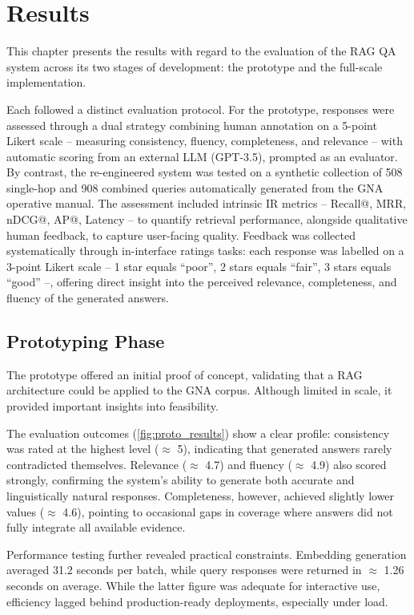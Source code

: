 \chapter{Results}
\label{chap:results}
\begin{spacing}{1.5}

This chapter presents the results with regard to the evaluation of the RAG QA system across its two stages of development: the prototype and the full-scale implementation. 

Each followed a distinct evaluation protocol. For the prototype, responses were assessed through a dual strategy combining human annotation on a 5-point Likert scale -- measuring consistency, fluency, completeness, and relevance -- with automatic scoring from an external LLM (GPT-3.5), prompted as an evaluator. By contrast, the re-engineered system was tested on a synthetic collection of 508 single-hop and 908 combined queries automatically generated from the GNA operative manual. The assessment included intrinsic IR metrics -- Recall@, MRR, nDCG@, AP@, Latency --  to quantify retrieval performance, alongside qualitative human feedback, to capture user-facing quality. Feedback was collected systematically through in-interface ratings tasks: each response was labelled on a 3-point Likert scale -- 1 star equals ``poor'', 2 stars equals ``fair'', 3 stars equals ``good'' --, offering direct insight into the perceived relevance, completeness, and fluency of the generated answers.


\section{Prototyping Phase}
The prototype offered an initial proof of concept, validating that a RAG architecture could be applied to the GNA corpus. Although limited in scale, it provided important insights into feasibility.

The evaluation outcomes (\autoref{fig:proto_results}) show a clear profile: consistency was rated at the highest level ($\approx$ 5), indicating that generated answers rarely contradicted themselves. Relevance ($\approx$ 4.7) and fluency ($\approx$ 4.9) also scored strongly, confirming the system’s ability to generate both accurate and linguistically natural responses. Completeness, however, achieved slightly lower values ($\approx$ 4.6), pointing to occasional gaps in coverage where answers did not fully integrate all available evidence.

Performance testing further revealed practical constraints. Embedding generation averaged 31.2 seconds per batch, while query responses were returned in $\approx$ 1.26 seconds on average. While the latter figure was adequate for interactive use, efficiency lagged behind production-ready deployments, especially under load. 


\end{spacing}
